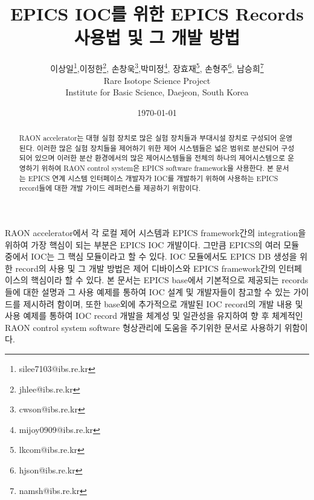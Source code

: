 \documentclass[11pt
  , a4paper
  , article
  , oneside
]{memoir}
\begin{document}
\newcommand{\technumber}{
  RAON Control-Document Series\\
  Revision : v1.0,   Release : 2015-06-08 fixed date}
\title{\textbf{EPICS IOC를 위한 EPICS Records 사용법 및 그 개발 방법}}

\author{이상일\thanks{silee7103@ibs.re.kr},이정한\thanks{jhlee@ibs.re.kr}, 손창욱\thanks{cwson@ibs.re.kr},박미정\thanks{mijoy0909@ibs.re.kr}, 장효재\thanks{lkcom@ibs.re.kr}, 손형주\thanks{hjson@ibs.re.kr}, 남승희\thanks{namsh@ibs.re.kr} \\

  Rare Isotope Science Project\\
  Institute for Basic Science, Daejeon, South Korea
}
\date{\today}

\renewcommand{\maketitlehooka}{\begin{flushright}\textsf{\technumber}\end{flushright}}

\maketitle

\begin{abstract}
RAON accelerator는 대형 실험 장치로 많은 실험 장치들과 부대시설 장치로 구성되어 운영된다. 이러한 많은 실험 장치들을 제어하기 위한 제어 시스템들은 넓은 범위로 분산되어 구성되어 있으며 이러한 분산 환경에서의 많은 제어시스템들을 전체의 하나의 제어시스템으로 운영하기 위하여 RAON control system은 EPICS software framework을 사용한다. 본 문서는 EPICS 연계 시스템 인터페이스 개발자가 IOC를 개발하기 위하여 사용하는 EPICS record들에 대한 개발 가이드 레퍼런스를 제공하기 위함이다.
\end{abstract}

RAON accelerator에서 각 로컬 제어 시스템과 EPICS framework간의 integration을 위하여 가장 핵심이 되는 부분은 EPICS IOC 개발이다. 그만큼 EPICS의 여러 모듈 중에서 IOC는 그 핵심 모듈이라고 할 수 있다. IOC 모듈에서도 EPICS DB 생성을 위한 record의 사용 및 그 개발 방법은 제어 디바이스와 EPICS framework간의 인터페이스의 핵심이라 할 수 있다. 본 문서는 EPICS base에서 기본적으로 제공되는 records들에 대한 설명과 그 사용 예제를 통하여 IOC 설계 및 개발자들이 참고할 수 있는 가이드를 제시하려 함이며, 또한 base외에 추가적으로 개발된 IOC record의 개발 내용 및 사용 예제를 통하여 IOC record 개발을 체계성 및 일관성을 유지하여 향 후 체계적인 RAON control system software 형상관리에 도움을 주기위한 문서로 사용하기 위함이다.
\end{document}
